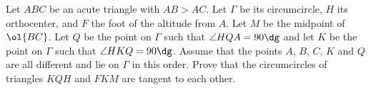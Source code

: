 Let $ABC$ be an acute triangle with $AB > AC$.
Let $\Gamma$ be its circumcircle, $H$ its orthocenter, and $F$ the foot of the altitude from $A$.
Let $M$ be the midpoint of $\ol{BC}$.
Let $Q$ be the point on $\Gamma$ such that $\angle HQA = 90\dg$
and let $K$ be the point on $\Gamma$ such that $\angle HKQ = 90\dg$.
Assume that the points $A$, $B$, $C$, $K$ and $Q$ are all different and lie on $\Gamma$ in this order.
Prove that the circumcircles of triangles $KQH$ and $FKM$ are tangent to each other.